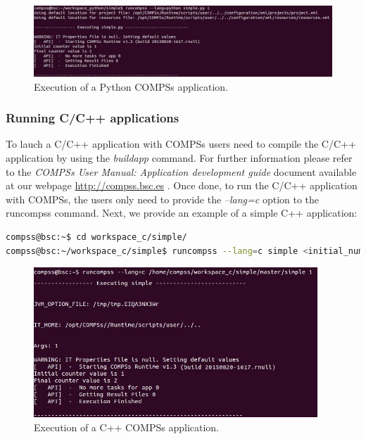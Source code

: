 \begin{figure}[h!]
  \centering
    \includegraphics[width=\textwidth]{./Sections/2_Execution/Figures/python_execution.jpeg}
    \caption{Execution of a Python COMPSs application.}
    \label{fig:python_execution}
\end{figure}
\vspace{-0.4cm}


\subsubsection{Running C/C++ applications}
To lauch a C/C++ application with COMPSs users need to compile the C/C++ application by using the \textit{buildapp} command. For 
further information please refer to the \textit{COMPSs User Manual: Application development guide} document available at our
webpage \url{http://compss.bsc.es} . Once done, to run the C/C++ application with COMPSs, the users only need to provide 
the \textit{--lang=c} option to the runcompss command. Next, we provide an example of a simple C++ application:

\begin{lstlisting}[language=bash]
compss@bsc:~$ cd workspace_c/simple/
compss@bsc:~/workspace_c/simple$ runcompss --lang=c simple <initial_number>
\end{lstlisting}

\begin{figure}[h!]
  \centering
    \includegraphics[width=0.95\textwidth]{./Sections/2_Execution/Figures/c_execution.jpeg}
    \caption{Execution of a C++ COMPSs application.}
    \label{fig:c_execution}
\end{figure}
\vspace{-0.4cm}


